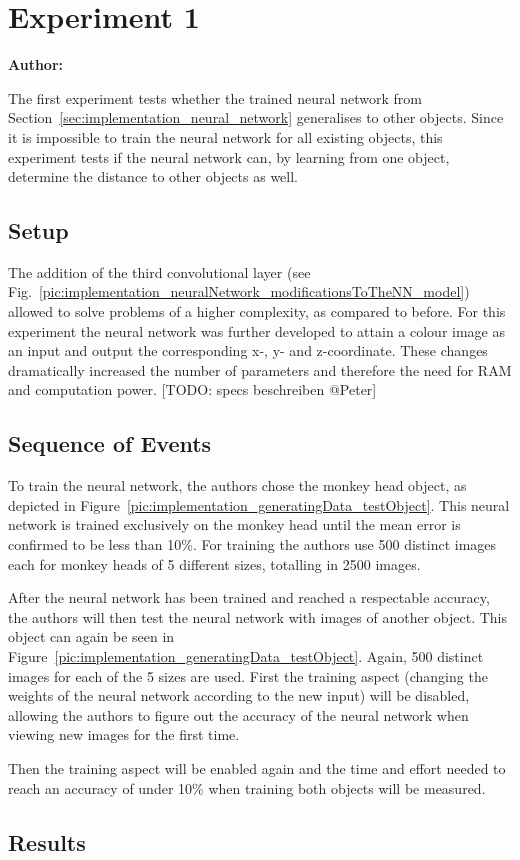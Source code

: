 \chapter{Experiment 1}
\label{cap:experiment1}

\textbf{Author: } 

The first experiment tests whether the trained neural network from Section~\ref{sec:implementation_neural_network} generalises to other objects. Since it is impossible to train the neural network for all existing objects, this experiment tests if the neural network can, by learning from one object, determine the distance to other objects as well.

\section{Setup}
The addition of the third convolutional layer (see Fig.~\ref{pic:implementation_neuralNetwork_modificationsToTheNN_model}) allowed to solve problems of a higher complexity, as compared to before. For this experiment the neural network was further developed to attain a colour image as an input and output the corresponding x-, y- and z-coordinate. These changes dramatically increased the number of parameters and therefore the need for RAM and computation power. [TODO: specs beschreiben @Peter]

\section{Sequence of Events}
To train the neural network, the authors chose the monkey head object, as depicted in Figure~\ref{pic:implementation_generatingData_testObject}. This neural network is trained exclusively on the monkey head until the mean error is confirmed to be less than 10\%. For training the authors use 500 distinct images each for monkey heads of 5 different sizes, totalling in 2500 images.

After the neural network has been trained and reached a respectable accuracy, the authors will then test the neural network with images of another object. This object can again be seen in Figure~\ref{pic:implementation_generatingData_testObject}. Again, 500 distinct images for each of the 5 sizes are used. First the training aspect (changing the weights of the neural network according to the new input) will be disabled, allowing the authors to figure out the accuracy of the neural network when viewing new images for the first time.

Then the training aspect will be enabled again and the time and effort needed to reach an accuracy of under 10\% when training both objects will be measured.

\section{Results}

\filbreak